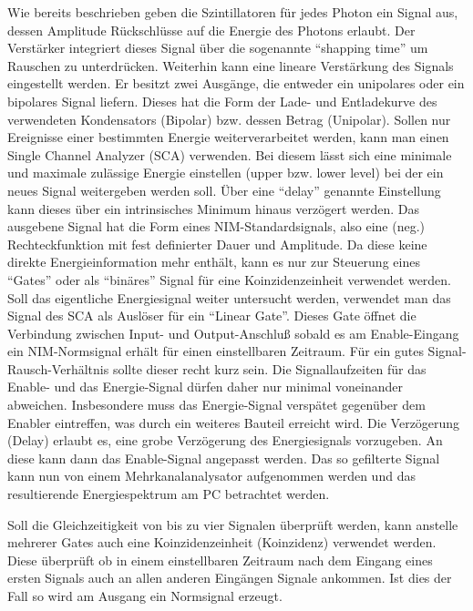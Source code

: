 Wie bereits beschrieben geben die Szintillatoren für jedes Photon ein Signal aus, dessen Amplitude Rückschlüsse auf die Energie des Photons erlaubt. Der Verstärker integriert dieses Signal über die sogenannte "`shapping time"' um Rauschen zu unterdrücken. Weiterhin kann eine lineare Verstärkung des Signals eingestellt werden. Er besitzt zwei Ausgänge, die entweder ein unipolares oder ein bipolares Signal liefern. Dieses hat die Form der Lade- und Entladekurve des verwendeten Kondensators (Bipolar) bzw. dessen Betrag (Unipolar). Sollen nur Ereignisse einer bestimmten Energie weiterverarbeitet werden, kann man einen Single Channel Analyzer (SCA) verwenden. Bei diesem lässt sich eine minimale und maximale zulässige Energie einstellen (upper bzw. lower level) bei der ein neues Signal weitergeben werden soll. Über eine "`delay"' genannte Einstellung kann dieses über ein intrinsisches Minimum hinaus verzögert werden. Das ausgebene Signal hat die Form eines NIM-Standardsignals, also eine (neg.) Rechteckfunktion mit fest definierter Dauer und Amplitude. Da diese keine direkte Energieinformation mehr enthält, kann es nur zur Steuerung eines "`Gates"' oder als "`binäres"' Signal für eine Koinzidenzeinheit verwendet werden. Soll das eigentliche Energiesignal weiter untersucht werden, verwendet man das Signal des SCA als Auslöser für ein "`Linear Gate"'. Dieses Gate öffnet die Verbindung zwischen Input- und Output-Anschluß sobald es am Enable-Eingang ein NIM-Normsignal erhält für einen einstellbaren Zeitraum. Für ein gutes Signal-Rausch-Verhältnis sollte dieser recht kurz sein. Die Signallaufzeiten für das Enable- und das Energie-Signal dürfen daher nur minimal voneinander abweichen. Insbesondere muss das Energie-Signal verspätet gegenüber dem Enabler eintreffen, was durch ein weiteres Bauteil erreicht wird. Die Verzögerung (Delay) erlaubt es, eine grobe Verzögerung des Energiesignals vorzugeben. An diese kann dann das Enable-Signal angepasst werden. Das so gefilterte Signal kann nun von einem Mehrkanalanalysator aufgenommen werden und das resultierende Energiespektrum am PC betrachtet werden.

Soll die Gleichzeitigkeit von bis zu vier Signalen überprüft werden, kann anstelle mehrerer Gates auch eine Koinzidenzeinheit (Koinzidenz) verwendet werden. Diese überprüft ob in einem einstellbaren Zeitraum nach dem Eingang eines ersten Signals auch an allen anderen Eingängen Signale ankommen. Ist dies der Fall so wird am Ausgang ein Normsignal erzeugt.